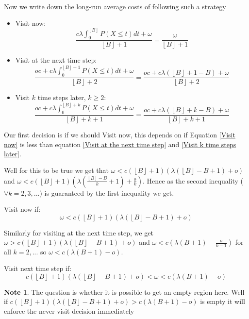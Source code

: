 \documentclass[a4paper,10pt]{article}
\newcommand{\floor}[1]{\left \lfloor #1 \right \rfloor}
\theoremstyle{definition}
\theoremstyle{definition}
\theoremstyle{remark}
\theoremstyle{definition}
\newtheorem*{note}{Note}
\begin{document}
Now we write down the long-run average costs of following such a strategy
\begin{itemize}
\item Visit now:
\begin{equation}
\label{Visit now}
\frac{c \lambda \int_{0}^{\floor{B}} P(X \leq t)dt +\omega}{\floor{B}+1}
=\frac{\omega}{\floor{B}+1}
\end{equation}
\item Visit at the next time step:
\begin{equation}
\label{Visit at the next time step}
\frac{oc+ c \lambda \int_{0}^{\floor{B}+1} P(X \leq t)dt+ \omega}{\floor{B}+2}
=\frac{oc + c \lambda (\floor{B}+1-B) + \omega}{\floor{B}+2}
\end{equation}
\item Visit $k$ time steps later, $k \geq 2$:
\begin{equation}
\label{Visit k time steps later}
\frac{oc+ c \lambda \int_{0}^{\floor{B}+k} P(X \leq t)dt+ \omega}{\floor{B}+k+1}
=\frac{oc + c \lambda (\floor{B}+k-B) + \omega}{\floor{B}+k+1}
\end{equation}
\end{itemize}

Our first decision is if we should Visit now, this depends on if Equation \ref{Visit now} is less than equation \ref{Visit at the next time step} and \ref{Visit k time steps later}.

Well for this to be true we get that $\omega < c(\floor{B}+1)(\lambda (\floor{B}-B+1) +o)$ and $\omega< c (\floor{B}+1)(\lambda (\frac{\floor{B}-B}{k}+1)+\frac{o}{k})$. Hence as the second inequality ($\forall k=2,3,...$) is guaranteed by the first inequality we get.

Visit now if:
\begin{equation}
\omega < c (\floor{B}+1) (\lambda (\floor{B}-B+1) +o)
\end{equation}

Similarly for visiting at the next time step, we get $\omega > c(\floor{B}+1)(\lambda (\floor{B}-B+1) +o)$ and $\omega < c (\lambda (B+1) - \frac{o}{k-1})$ for all $k=2,...$ so $\omega < c (\lambda (B+1) -o)$.

Visit next time step if:
\begin{equation}
c(\floor{B}+1)(\lambda (\floor{B}-B+1) +o)< \omega < c (\lambda (B+1) -o)
\end{equation}

\begin{note}
The question is whether it is possible to get an empty region here. Well if $c(\floor{B}+1)(\lambda (\floor{B}-B+1) +o) > c (\lambda (B+1) -o)$ is empty it will enforce the never visit decision immediately
\end{note}
\end{document}
